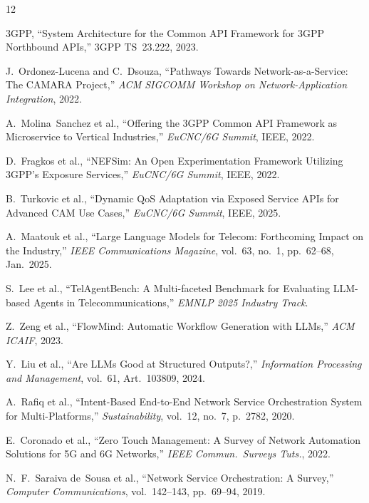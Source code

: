 \documentclass[conference]{IEEEtran}
\begin{document}
\begin{thebibliography}{12}

3GPP, ``System Architecture for the Common API Framework for 3GPP
Northbound APIs,'' 3GPP TS~23.222, 2023.

J.~Ordonez-Lucena and C.~Dsouza, ``Pathways Towards Network-as-a-Service:
The CAMARA Project,'' \emph{ACM SIGCOMM Workshop on Network-Application
Integration}, 2022.

A.~Molina~Sanchez et al., ``Offering the 3GPP Common API Framework as
Microservice to Vertical Industries,'' \emph{EuCNC/6G Summit}, IEEE, 2022.

D.~Fragkos et al., ``NEFSim: An Open Experimentation Framework Utilizing
3GPP's Exposure Services,'' \emph{EuCNC/6G Summit}, IEEE, 2022.

B.~Turkovic et al., ``Dynamic QoS Adaptation via Exposed Service APIs
for Advanced CAM Use Cases,'' \emph{EuCNC/6G Summit}, IEEE, 2025.

A.~Maatouk et al., ``Large Language Models for Telecom: Forthcoming
Impact on the Industry,'' \emph{IEEE Communications Magazine},
vol.~63, no.~1, pp.~62--68, Jan.\ 2025.

S.~Lee et al., ``TelAgentBench: A Multi-faceted Benchmark for Evaluating
LLM-based Agents in Telecommunications,'' \emph{EMNLP 2025 Industry Track}.

Z.~Zeng et al., ``FlowMind: Automatic Workflow Generation with LLMs,''
\emph{ACM ICAIF}, 2023.

Y.~Liu et al., ``Are LLMs Good at Structured Outputs?,''
\emph{Information Processing and Management}, vol.~61, Art.~103809, 2024.

A.~Rafiq et al., ``Intent-Based End-to-End Network Service Orchestration
System for Multi-Platforms,'' \emph{Sustainability}, vol.~12, no.~7,
p.~2782, 2020.

E.~Coronado et al., ``Zero Touch Management: A Survey of Network
Automation Solutions for 5G and 6G Networks,''
\emph{IEEE Commun.\ Surveys Tuts.}, 2022.

N.~F.~Saraiva de~Sousa et al., ``Network Service Orchestration: A Survey,''
\emph{Computer Communications}, vol.~142--143, pp.~69--94, 2019.

\end{thebibliography}
\end{document}
